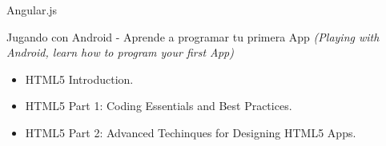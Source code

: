 \documentclass[]{cvStyle1}
\begin{document}
        
	    {Angular.js}
        
	    {Jugando con Android - Aprende a programar tu primera App {\em(Playing with Android, learn how to program your first App)}}
        
        {
            \vspace{-7mm}
            \begin{itemize}[leftmargin=0cm,label={-}]
                \item HTML5 Introduction.
                \item HTML5 Part 1: Coding Essentials and Best Practices.
                \item HTML5 Part 2: Advanced Techinques for Designing HTML5 Apps.
            \end{itemize}
        }
            
\end{document}

